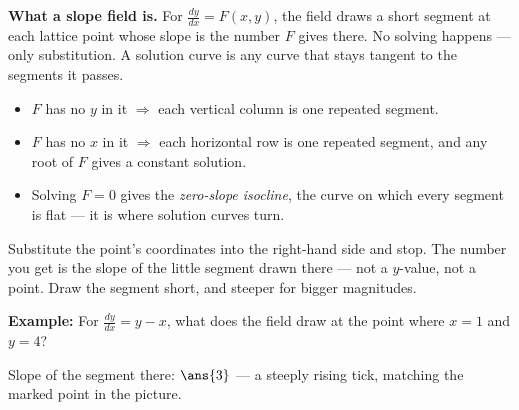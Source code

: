 \documentclass[12pt]{article}
\begin{document}

\begin{formulabox}
\textbf{What a slope field is.} For $\frac{dy}{dx} = F(x,y)$, the field draws a
short segment at each lattice point whose slope is the number $F$ gives there.
No solving happens --- only substitution. A solution curve is any curve that
stays tangent to the segments it passes.
\begin{itemize}[leftmargin=1.1cm, itemsep=1pt, topsep=2pt]
\item $F$ has no $y$ in it $\Rightarrow$ each vertical column is one repeated
segment.
\item $F$ has no $x$ in it $\Rightarrow$ each horizontal row is one repeated
segment, and any root of $F$ gives a constant solution.
\item Solving $F = 0$ gives the \emph{zero-slope isocline}, the curve on which
every segment is flat --- it is where solution curves turn.
\end{itemize}
\end{formulabox}


\begin{formulabox}
Substitute the point's coordinates into the right-hand side and stop. The
number you get is the slope of the little segment drawn there --- not a
$y$-value, not a point. Draw the segment short, and steeper for bigger
magnitudes.
\end{formulabox}

\begin{examplebox}
\textbf{Example:} For $\frac{dy}{dx} = y - x$, what does the field draw at the
point where $x = 1$ and $y = 4$?
\begin{center}
\end{center}
Slope of the segment there: $\ans{3}$ --- a steeply rising tick, matching the
marked point in the picture.
\end{examplebox}
\end{document}
